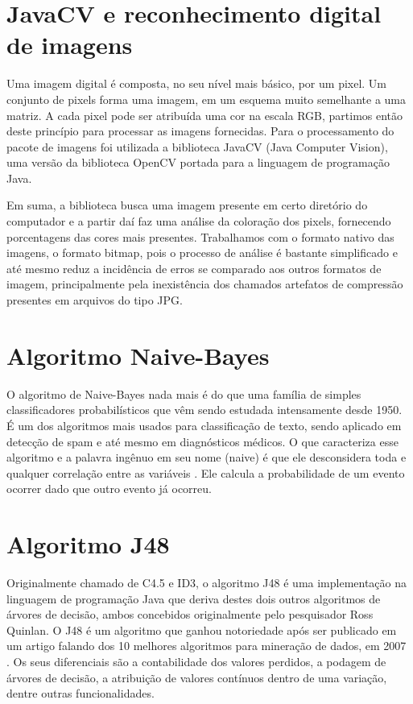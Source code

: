 \documentclass[12pt]{article}
\begin{document}
\section{JavaCV e reconhecimento digital de imagens} 

Uma imagem digital é composta, no seu nível mais básico, por um pixel. Um conjunto de pixels forma uma imagem, em um esquema muito semelhante a uma matriz. A cada pixel pode ser atribuída uma cor na escala RGB, partimos então deste princípio para processar as imagens fornecidas. Para o processamento do pacote de imagens foi utilizada a biblioteca JavaCV (Java Computer Vision), uma versão da biblioteca OpenCV portada para a linguagem de programação Java. 

Em suma, a biblioteca busca uma imagem presente em certo diretório do computador e a partir daí faz uma análise da coloração dos pixels, fornecendo porcentagens das cores mais presentes. Trabalhamos com o formato nativo das imagens, o formato bitmap, pois o processo de análise é bastante simplificado e até mesmo reduz a incidência de erros se comparado aos outros formatos de imagem, principalmente pela inexistência dos chamados artefatos de compressão presentes em arquivos do tipo JPG.

\section{Algoritmo Naive-Bayes}
O algoritmo de Naive-Bayes nada mais é do que uma família de simples classificadores probabilísticos que vêm sendo estudada intensamente desde 1950. É um dos algoritmos mais usados para classificação de texto, sendo aplicado em detecção de spam e até mesmo em diagnósticos médicos. O que caracteriza esse algoritmo e a palavra ingênuo em seu nome (naive) é que ele desconsidera toda e qualquer correlação entre as variáveis \cite{Organica:35}. Ele calcula a probabilidade de um evento ocorrer dado que outro evento já ocorreu.



\section{Algoritmo J48}
Originalmente chamado de C4.5 e ID3, o algoritmo J48 é uma implementação na linguagem de programação Java que deriva destes dois outros algoritmos de árvores de decisão, ambos concebidos originalmente pelo pesquisador Ross Quinlan. O J48 é um algoritmo que ganhou notoriedade após ser publicado em um artigo falando dos 10 melhores algoritmos para mineração de dados, em 2007 \cite{Top:10}. Os seus diferenciais são a contabilidade dos valores perdidos, a podagem de árvores de decisão, a atribuição de valores contínuos dentro de uma variação, dentre outras funcionalidades.
\end{document}
